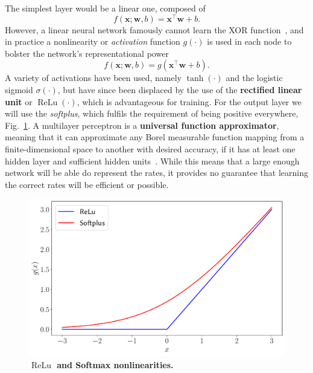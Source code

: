 \noindent
The simplest layer would be a linear one, composed of
\begin{equation}
f(\mathbf{x}; \mathbf{w}, b) = \mathbf{x}^\intercal \mathbf{w} + b.
\end{equation}
However, a linear neural network famously cannot learn the XOR function~\cite{minsky2017perceptrons}, and in practice a nonlinearity or \emph{activation} function $g(\cdot)$ is used in each node to bolster the network's representational power
\begin{equation}
f(\mathbf{x}; \mathbf{w}, b) = g\left(\mathbf{x}^\intercal \mathbf{w} + b\right).
\end{equation}
A variety of activations have been used, namely $\tanh(\cdot)$ and the logistic sigmoid $\sigma(\cdot)$, but have since been displaced by the use of the \textbf{rectified linear unit} or $\operatorname{ReLu}(\cdot)$, which is advantageous for training. For the output layer we will use the \emph{softplus}, which fulfils the requirement of being positive everywhere, Fig.~\ref{fig:activations}. A multilayer perceptron is a \textbf{universal function approximator}, meaning that it can approximate any Borel measurable function mapping from a finite-dimensional space to another with desired accuracy, if it has at least one hidden layer and sufficient hidden units~\cite{leshno1993multilayer}. While this means that a large enough network will be able do represent the rates, it provides no guarantee that learning the correct rates will be efficient or possible. 
\begin{figure}[H]
	\centering
	\includegraphics[width=0.7\linewidth]{Chapter4/Figs/Vector/activations}
	\caption[$\operatorname{ReLu}$ and Softmax nonlinearities.]{\textbf{$\operatorname{ReLu}$ and Softmax nonlinearities.}}
	\label{fig:activations}
\end{figure}

